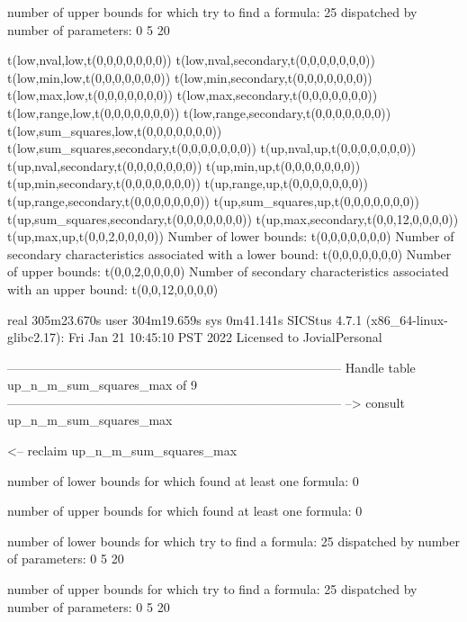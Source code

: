 number of upper bounds for which try to find a formula: 25
dispatched by number of parameters: 0  5  20

t(low,nval,low,t(0,0,0,0,0,0,0))
t(low,nval,secondary,t(0,0,0,0,0,0,0))
t(low,min,low,t(0,0,0,0,0,0,0))
t(low,min,secondary,t(0,0,0,0,0,0,0))
t(low,max,low,t(0,0,0,0,0,0,0))
t(low,max,secondary,t(0,0,0,0,0,0,0))
t(low,range,low,t(0,0,0,0,0,0,0))
t(low,range,secondary,t(0,0,0,0,0,0,0))
t(low,sum_squares,low,t(0,0,0,0,0,0,0))
t(low,sum_squares,secondary,t(0,0,0,0,0,0,0))
t(up,nval,up,t(0,0,0,0,0,0,0))
t(up,nval,secondary,t(0,0,0,0,0,0,0))
t(up,min,up,t(0,0,0,0,0,0,0))
t(up,min,secondary,t(0,0,0,0,0,0,0))
t(up,range,up,t(0,0,0,0,0,0,0))
t(up,range,secondary,t(0,0,0,0,0,0,0))
t(up,sum_squares,up,t(0,0,0,0,0,0,0))
t(up,sum_squares,secondary,t(0,0,0,0,0,0,0))
t(up,max,secondary,t(0,0,12,0,0,0,0))
t(up,max,up,t(0,0,2,0,0,0,0))
Number of lower bounds:                                             t(0,0,0,0,0,0,0)
Number of secondary characteristics associated with a lower bound:  t(0,0,0,0,0,0,0)
Number of upper bounds:                                             t(0,0,2,0,0,0,0)
Number of secondary characteristics associated with an upper bound: t(0,0,12,0,0,0,0)

real	305m23.670s
user	304m19.659s
sys	0m41.141s
SICStus 4.7.1 (x86_64-linux-glibc2.17): Fri Jan 21 10:45:10 PST 2022
Licensed to JovialPersonal


--------------------------------------------------------------------------------
Handle table up_n_m_sum_squares_max of 9
--------------------------------------------------------------------------------
--> consult up_n_m_sum_squares_max

<-- reclaim up_n_m_sum_squares_max

number of lower bounds for which found at least one formula: 0

number of upper bounds for which found at least one formula: 0

number of lower bounds for which try to find a formula: 25
dispatched by number of parameters: 0  5  20

number of upper bounds for which try to find a formula: 25
dispatched by number of parameters: 0  5  20

